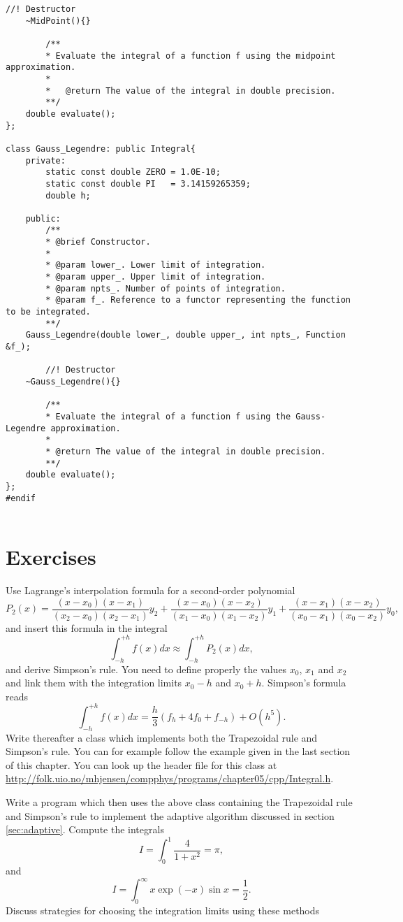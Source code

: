 \begin{lstlisting}[title={\url{http://folk.uio.no/mhjensen/compphys/programs/chapter05/cpp/Integral.h}}]
		//! Destructor
    ~MidPoint(){}
		
		/**
		* Evaluate the integral of a function f using the midpoint approximation.
		*
		*	@return The value of the integral in double precision.
		**/
    double evaluate();
};

class Gauss_Legendre: public Integral{
	private:
		static const double ZERO = 1.0E-10;
		static const double PI	 = 3.14159265359; 
		double h;
		
	public:
		/**
		* @brief Constructor.
		*
		* @param lower_. Lower limit of integration.
		* @param upper_. Upper limit of integration.
		* @param npts_. Number of points of integration.
		* @param f_. Reference to a functor representing the function to be integrated.
		**/
    Gauss_Legendre(double lower_, double upper_, int npts_, Function &f_);
    
		//! Destructor
    ~Gauss_Legendre(){}
		
		/** 
		* Evaluate the integral of a function f using the Gauss-Legendre approximation.
		*
		* @return The value of the integral in double precision.
		**/
    double evaluate();
};
#endif


\end{lstlisting}
\section{Exercises}

\begin{prob}
Use Lagrange's interpolation formula for a second-order polynomial
\[
     P_2(x)=\frac{(x-x_0)(x-x_1)}{(x_2-x_0)(x_2-x_1)}y_2+
            \frac{(x-x_0)(x-x_2)}{(x_1-x_0)(x_1-x_2)}y_1+
            \frac{(x-x_1)(x-x_2)}{(x_0-x_1)(x_0-x_2)}y_0,
\]
and insert this formula in the integral
\[
   \int_{-h}^{+h}f(x)dx\approx \int_{-h}^{+h}P_2(x)dx, 
\]
and derive Simpson's rule. You need to define properly the values $x_0$, $x_1$ and $x_2$ and link them with the integration limits $x_0-h$ and $x_0+h$.
Simpson's formula reads
\[
   \int_{-h}^{+h}f(x)dx=\frac{h}{3}\left(f_h + 4f_0 + f_{-h}\right)+O(h^5).
\]
Write thereafter a class which implements both the Trapezoidal rule and Simpson's rule. You can for example follow the example given in the last section of this chapter. You can look up the header file for this class at \url{http://folk.uio.no/mhjensen/compphys/programs/chapter05/cpp/Integral.h}.
\end{prob}

\begin{prob}
Write a program which then uses the above class containing the Trapezoidal rule and Simpson's rule
to implement the adaptive algorithm discussed in section \ref{sec:adaptive}.
Compute the integrals 
\[
I=\int_0^1\frac{4}{1+x^2}=\pi,
\]
and
\[
I= \int_0^{\infty} x\exp{(-x)}\sin{x}=\frac{1}{2}.
\]
Discuss strategies for choosing the integration limits using these methods
\end{prob}


